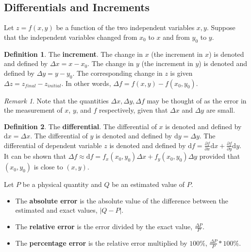 \documentclass[11pt]{article}
\theoremstyle{plain} %
\theoremstyle{definition}
\newtheorem*{definition}{Definition} %
\theoremstyle{example}
\theoremstyle{remark}
\newtheorem*{remark}{Remark}
\begin{document}
\subsection{Differentials and Increments}

Let $z=f(x, y)$ be a function of the two independent variables $x, y$. Suppose that the independent variables changed from $x_0$ to $x$ and from $y_0$ to $y$. 

\begin{definition}
The \textbf{increment}. The change in $x$ (the increment in $x$) is denoted and defined by $\Delta x = x -x_0$.
The change in $y$ (the increment in $y$) is denoted and defined by $\Delta y = y- y_0$.
The corresponding change in $z$ is given $\Delta z = z_{final} - z_{initial}$. In other words, $\Delta f = f(x,y)-f(x_0, y_0)$.
\end{definition}

\begin{remark}
Note that the quantities $\Delta x, \Delta y, \Delta f$ may be thought of as the error in the measurement of $x$, $y$, and $f$ respectively, given that $\Delta x$ and $\Delta y$ are small.
\end{remark}

\begin{definition}
The \textbf{differential}. The differential of $x$ is denoted and defined by $\mathrm d x = \Delta x$.
The differential of $y$ is denoted and defined by $\mathrm d y = \Delta y$.
The differential of dependent variable $z$ is denoted and defined by $\mathrm d f = \frac{\partial f}{\partial x} \mathrm d x+ \frac{\partial f}{\partial y} \mathrm d y$. It can be shown that $\Delta f \approx \mathrm d f = f_x(x_0, y_0)\Delta x + f_y(x_0, y_0)\Delta y$ provided that $(x_0, y_0)$ is close to $(x, y)$. 
\end{definition}



Let $P$ be a physical quantity and $Q$ be an estimated value of $P$. 

\begin{itemize}
	\item The \textbf{absolute error} is the absolute value of the difference between the estimated and exact values, $|Q-P|$. 
	\item The \textbf{relative error} is the error divided by the exact value, $ \frac{\Delta P}{P}$. 
	\item The \textbf{percentage error} is the relative error multiplied by $100\%$, $ \frac{\Delta P}{P}*100\%$.
\end{itemize}
\end{document}
